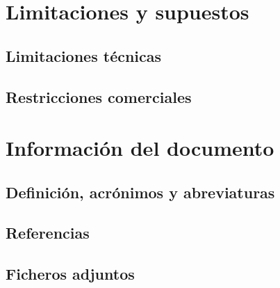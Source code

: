 \section{Limitaciones y supuestos}
\subsection{Limitaciones técnicas}
\subsection{Restricciones comerciales}


\section{Información del documento}
\subsection{Definición, acrónimos y abreviaturas}
\subsection{Referencias}
\subsection{Ficheros adjuntos}

\chapterend
